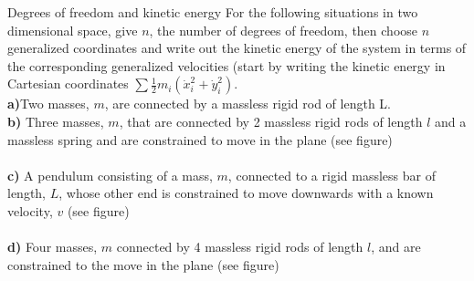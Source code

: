 %
\begin{problem}{Degrees of freedom and kinetic energy}
\label{prob_Intro_2}
For the following situations in two dimensional space, give $n$, the number of degrees of freedom, then choose $n$ generalized coordinates and write out the kinetic energy of the system in terms of the corresponding generalized velocities (start by writing the kinetic energy in Cartesian coordinates $\sum \frac{1}{2}m_i(\dot x_i^2+\dot y_i^2)$.\\
\textbf{a)}Two masses, $m$, are connected by a massless rigid rod of length L.\\
\textbf{b)} Three masses, $m$, that are connected by 2 massless rigid rods of length $l$ and a massless spring and are constrained to move in the plane (see figure)\\
\\
\textbf{c)} A pendulum consisting of a mass, $m$, connected to a rigid massless bar of length, $L$, whose other end is constrained to move downwards with a known velocity, $v$ (see figure)\\
\\
\textbf{d)} Four masses, $m$ connected by 4 massless rigid rods of length $l$, and are constrained to the move in the plane (see figure)\\
\end{problem}
%
%
